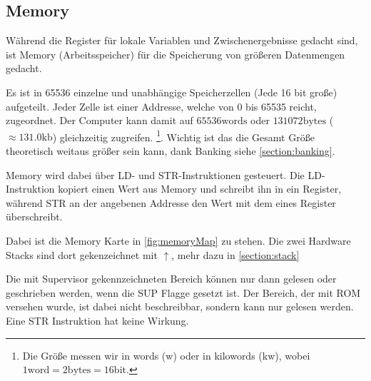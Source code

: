 \documentclass{scrartcl}
\begin{document}
\subsection{\label{section:memory}Memory}

Während die Register für lokale Variablen und Zwischenergebnisse gedacht sind, ist Memory (Arbeitsspeicher) für die Speicherung von größeren Datenmengen gedacht.

Es ist in 65536 einzelne und unabhängige Speicherzellen (Jede 16 bit große) aufgeteilt. Jeder Zelle ist einer Addresse, welche von 0 bis 65535 reicht, zugeordnet. Der Computer kann damit auf $65536 \text{words}$ oder $131072 \text{bytes}$ ($\approx 131.0 \text{kb}$) gleichzeitig zugreifen.
\footnote{Die Größe messen wir in words (w) oder in kilowords (kw), wobei $1 \text{word} = 2 \text{bytes} = 16 \text{bit}$.}. Wichtig ist das die Gesamt Größe theoretisch weitaus größer sein kann, dank Banking siehe \autoref{section:banking}.

Memory wird dabei über LD- und STR-Instruktionen gesteuert. Die LD-Instruktion kopiert einen Wert aus Memory und schreibt ihn in ein Register, während STR an der angebenen Addresse den Wert mit dem eines Register überschreibt.

Dabei ist die Memory Karte in \autoref{fig:memoryMap} zu stehen. Die zwei Hardware Stacks sind dort gekenzeichnet mit $\uparrow$, mehr dazu in \autoref{section:stack}

Die mit Supervisor gekennzeichneten Bereich können nur dann gelesen oder geschrieben werden, wenn die SUP Flagge gesetzt ist. Der Bereich, der mit ROM versehen wurde, ist dabei nicht beschreibbar, sondern kann nur gelesen werden. Eine STR Instruktion hat keine Wirkung.
\end{document}
